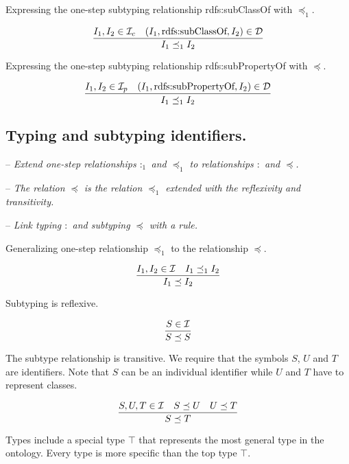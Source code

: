 \documentclass[runningheads]{llncs}
\newcommand{\D}{{\cal D}}
\newcommand{\I}{{\cal I}}
\newcommand{\Ic}{{\cal I}_c}
\newcommand{\Ip}{{\cal I}_p}
\newcommand{\nl}{\hfill\break}
\newcommand{\notes}[1]{\noindent\begin{small}-- \emph{#1}\\\end{small}}
\begin{document}
Expressing the one-step subtyping relationship rdfs:subClassOf with $\preceq_1$.

\begin{equation}
\dfrac{I_1,I_2\in\Ic \quad (I_1,\text{rdfs:subClassOf},I_2)\in \D}
{I_1 \preceq_1 I_2}
\end{equation}

Expressing the one-step subtyping relationship rdfs:subPropertyOf with $\preceq$.

\begin{equation}
\dfrac{I_1,I_2\in\Ip \quad (I_1,\text{rdfs:subPropertyOf},I_2)\in \D}
      {I_1\preceq_1\/I_2}
\end{equation}




\subsection{Typing and subtyping identifiers.}\nl

\notes{Extend one-step relationships $:_1$ and $\preceq_1$ to relationships $:$ and $\preceq$.}
\notes{The relation $\preceq$ is the relation $\preceq_1$ extended with the reflexivity and transitivity.}
\notes{Link typing $:$ and subtyping $\preceq$ with a rule.}



\noindent
Generalizing one-step relationship $\preceq_1$ to the relationship
$\preceq$.

\begin{equation}
\dfrac{I_1,I_2\in\I \quad I_1\preceq_1 I_2}
      {I_1 \preceq I_2}
\end{equation}

Subtyping is reflexive.

\begin{equation}
\dfrac{S\in \I}
      {S\preceq\/S}
\end{equation}

The subtype relationship is transitive. We require that the
symbols $S$, $U$ and $T$ are identifiers. Note that $S$ can be an
individual identifier while $U$ and $T$ have to represent
classes.

\begin{equation}
\dfrac{S,U,T\in\I \quad S\preceq\/U \quad U\preceq\/T}
      {S\preceq\/T}   
\end{equation}

Types include a special type $\top$ that represents the most
general type in the ontology. Every type is more specific than the top
type $\top$.
\end{document}
